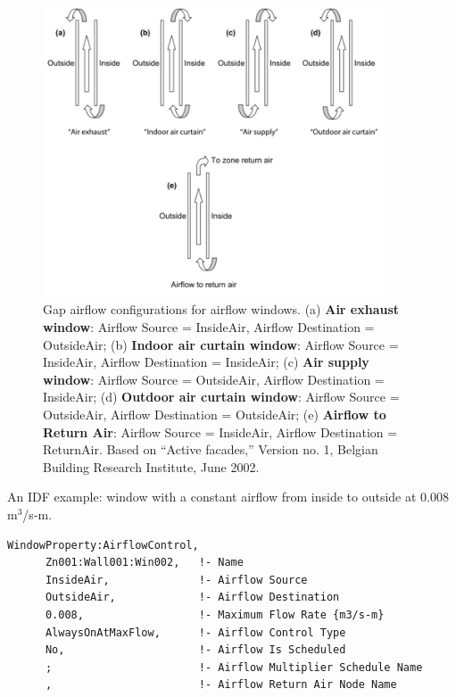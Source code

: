 \begin{figure}[hbtp] %
\centering
\includegraphics[width=0.9\textwidth, height=0.9\textheight, keepaspectratio=true]{media/image065.png}
  \caption{Gap airflow configurations for airflow windows. (a) \textbf{Air exhaust window}: Airflow Source = InsideAir, Airflow Destination = OutsideAir; (b) \textbf{Indoor air curtain window}: Airflow Source = InsideAir, Airflow Destination = InsideAir; (c) \textbf{Air supply window}: Airflow Source = OutsideAir, Airflow Destination = InsideAir; (d) \textbf{Outdoor air curtain window}: Airflow Source = OutsideAir, Airflow Destination = OutsideAir; (e) \textbf{Airflow to Return Air}: Airflow Source = InsideAir, Airflow Destination = ReturnAir. Based on ``Active facades,'' Version no. 1, Belgian Building Research Institute, June 2002. \protect \label{fig:gap-airflow-configurations-for-airflow}}
\end{figure}

An IDF example: window with a constant airflow from inside to outside at 0.008 m\(^{3}\)/s-m.

\begin{lstlisting}
WindowProperty:AirflowControl,
      Zn001:Wall001:Win002,   !- Name
      InsideAir,              !- Airflow Source
      OutsideAir,             !- Airflow Destination
      0.008,                  !- Maximum Flow Rate {m3/s-m}
      AlwaysOnAtMaxFlow,      !- Airflow Control Type
      No,                     !- Airflow Is Scheduled
      ;                       !- Airflow Multiplier Schedule Name
      ,                       !- Airflow Return Air Node Name
\end{lstlisting}

